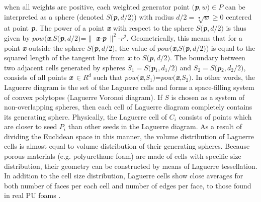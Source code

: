 \documentclass[review]{elsarticle}
\begin{document}
when  all  weights  are  positive,  each  weighted  generator  point $($\textbf{\textit{p}}$,w)\in P$ can  be  interpreted  as  a  sphere 
(denoted $S($\textbf{\textit{p}}$,d/2)$) with radius $d/2=\sqrt[•]{w}\geq0$  centered at point \textbf{\textit{p}}. The power of a point \textbf{\textit{x}} with respect to the 
sphere $S($\textbf{\textit{p}}$,d/2)$ is thus given by $pow($\textbf{\textit{x}},$S($\textbf{\textit{p}}$,d/2)$=$\parallel$ \textbf{\textit{x}}-\textbf{\textit{p}}$\ \parallel^2$-$r^2$. Geometrically, this means that for a point \textbf{\textit{x}} outside the sphere $S($\textbf{\textit{p}}$,d/2)$, the value of $pow($\textbf{\textit{x}},$S($\textbf{\textit{p}}$,d/2))$ is equal to the squared length of the tangent line 
from \textbf{\textit{x}} to $S($\textbf{\textit{p}}$,d/2)$.  The  boundary  between  two  adjacent  cells  generated  by  spheres $S_1=S($\textbf{\textit{p}}$_1,d_1/2)$ and $S_2=S($\textbf{\textit{p}}$_2,d_2/2)$, consists of all points \textbf{\textit{x}}$\ \in R^d$  such that $pow($\textbf{\textit{x}},$S_1)$=$pow($\textbf{\textit{x}},$S_2)$. In other words, the Laguerre 
diagram is the set of the Laguerre cells and forms a space-filling system of convex polytopes (Laguerre 
Voronoi diagram). If $S$ is chosen as a system of non-overlapping spheres, then each cell of Laguerre diagram 
completely contains its generating sphere. Physically, the Laguerre cell of $C_i$ consists of points 
which are closer to seed $P_i$ than other seeds in the Laguerre diagram. As a result of dividing the Euclidean 
space in this manner, the volume distribution of Laguerre cells is almost equal to volume distribution of 
their generating spheres. Because porous materials (e.g. polyurethane foam) are made of cells with specific 
size distribution, their geometry can be constructed by means of Laguerre tessellation. In addition to the 
cell size distribution, Laguerre cells show close averages for both number of faces per each cell and number 
of edges per face, to those found in real PU foams \citep{Fan2004,Rhodes1994}.  
\end{document}
